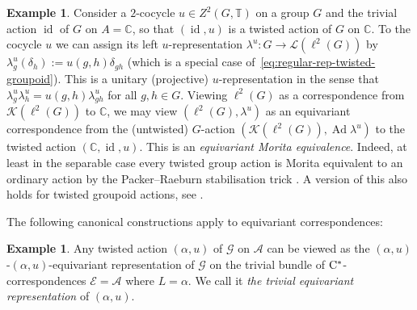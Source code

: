 \documentclass[11 pt, leqno]{amsart}
\numberwithin{equation}{section}
\theoremstyle{plain}
\theoremstyle{definition}
\newtheorem{ex}[thm]{Example}
\DeclareMathOperator{\id}{id}
\DeclareMathOperator{\Ad}{Ad}
\newcommand{\LL}{\mathcal L}
\newcommand{\G}{\mathcal G} %
\newcommand{\EE}{\mathcal E}
\newcommand{\K}{\mathcal{K}}
\newcommand{\A}{\mathcal A}
\newcommand{\C}{\mathbb C}
\newcommand{\T}{\mathbb T}
\newcommand{\cst}{\ifmmode\mathrm{C}^*\else{$\mathrm{C}^*$}\fi}
\begin{document}
\begin{ex}
Consider a $2$-cocycle $u\in Z^2(G,\T)$ on a group $G$ and the trivial action $\id$ of $G$ on $A=\C$, so that $(\id,u)$ is a twisted action of $G$ on $\C$. 
To the cocycle $u$ we can assign its left $u$-representation $\lambda^u\colon G\to \LL(\ell^2(G))$ by $\lambda^u_g(\delta_h) := u(g,h)\delta_{gh}$ (which is a special case of~\eqref{eq:regular-rep-twisted-groupoid}). 
This is a unitary (projective) $u$-representation in the sense that $\lambda^u_g\lambda^u_h=u(g,h)\lambda^u_{gh}$ for all $g,h\in G$.
Viewing $\ell^2(G)$ as a correspondence from $\K(\ell^2(G))$ to $\C$, we may view $(\ell^2(G),\lambda^u)$ as an equivariant correspondence from the (untwisted) $G$-action $(\K(\ell^2(G)),\Ad\lambda^u)$ to the twisted action $(\C,\id,u)$. 
This is an \emph{equivariant Morita equivalence}. 
Indeed, at least in the separable case every twisted group action is Morita equivalent to an ordinary action by the Packer--Raeburn stabilisation trick \cite{PackerRaeburn}. 
A version of this also holds for twisted groupoid actions, see \cite[Theorem~5.3]{BussMeyerZhu}.
\end{ex}

The following canonical constructions apply to equivariant correspondences: 

\begin{ex}\label{ex:trivial_equivariant_action} 
Any twisted action $(\alpha,u)$ of $\G$ on $\A$ can be viewed as the  $(\alpha,u)$-$(\alpha,u)$-equivariant representation of $\G$ on the trivial bundle of $\cst$-correspondences $\EE=\A$  where $L=\alpha$. 
We call it \emph{the trivial equivariant representation} of $(\alpha,u)$.
\end{ex}
\end{document}
